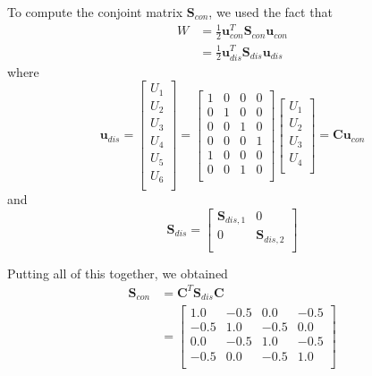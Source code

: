 \documentclass[journal,hidelinks]{IEEEtran}
\begin{document}
To compute the conjoint matrix $\boldsymbol{S}_{con}$, we used the fact that
\begin{align}
W &= \frac{1}{2} \boldsymbol{u}^T_{con} \boldsymbol{S}_{con} \boldsymbol{u}_{con} \\
  &= \frac{1}{2} \boldsymbol{u}^T_{dis} \boldsymbol{S}_{dis} \boldsymbol{u}_{dis}
\end{align}
where
\begin{equation}
\boldsymbol{u}_{dis} =
\begin{bmatrix}
U_1 \\
U_2 \\
U_3 \\
U_4 \\
U_5 \\
U_6 \\
\end{bmatrix} =
\begin{bmatrix}
1 & 0 & 0 & 0 \\
0 & 1 & 0 & 0 \\
0 & 0 & 1 & 0 \\
0 & 0 & 0 & 1 \\
1 & 0 & 0 & 0 \\
0 & 0 & 1 & 0 \\
\end{bmatrix}
\begin{bmatrix}
U_1 \\
U_2 \\
U_3 \\
U_4 \\
\end{bmatrix} =
\boldsymbol{C} \boldsymbol{u}_{con}
\end{equation}
and
\begin{equation}
\boldsymbol{S}_{dis} =
\begin{bmatrix}
\boldsymbol{S}_{dis,1} & 0 \\
0 & \boldsymbol{S}_{dis,2} \\
\end{bmatrix}
\end{equation}

Putting all of this together, we obtained
\begin{align}
\boldsymbol{S}_{con} &= \boldsymbol{C}^T \boldsymbol{S}_{dis} \boldsymbol{C} \\
\label{eq:s-con}
&=
\begin{bmatrix}
1.0 & -0.5 & 0.0 & -0.5 \\
-0.5 & 1.0 & -0.5 & 0.0 \\
0.0 & -0.5 & 1.0 & -0.5 \\
-0.5 & 0.0 & -0.5 & 1.0 \\
\end{bmatrix}
\end{align}
\end{document}
